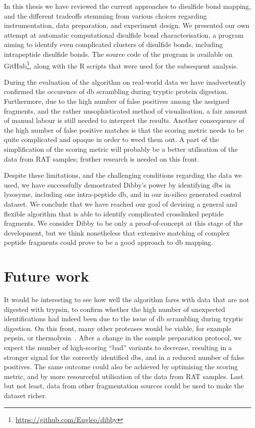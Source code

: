 
In this thesis we have reviewed the current approaches to disulfide bond mapping, and the different tradeoffs stemming from various choices regarding instrumentation, data preparation, and experiment design. We presented our own attempt at automatic computational disulfide bond characterisation, a program aiming to identify even complicated clusters of disulfide bonds, including intrapeptide disulfide bonds. The source code of the program is available on GitHub\footnote{\url{https://github.com/Eugleo/dibby}}, along with the R scripts that were used for the subsequent analysis.

During the evaluation of the algorithm on real-world data we have inadvertently confirmed the occurence of \gls*{db} scrambling during tryptic protein digestion. Furthermore, due to the high number of false positives among the assigned fragments, and the rather unsophisticated method of visualisation, a fair amount of manual labour is still needed to interpret the results. Another consequence of the high number of false positive matches is that the scoring metric needs to be quite complicated and opaque in order to weed them out. A part of the simplification of the scoring metric will probably be a better utilisation of the data from RAT samples; fruther research is needed on this front.

Despite these limitations, and the challenging conditions regarding the data we used, we have successfully demostrated Dibby's power by identifying \glspl*{db} in lysosyme, including one intra-peptide \gls*{db}, and in our in-silico generated control dataset. We conclude that we have reached our goal of devising a general and flexible algorithm that is able to identify complicated crosslinked peptide fragments. We consider Dibby to be only a proof-of-concept at this stage of the development, but we think nonetheless that extensive matching of complex peptide fragments could prove to be a good approach to \gls*{db} mapping.

\section*{Future work}

It would be interesting to see how well the algorithm fares with data that are not digested with trypsin, to confirm whether the high number of unexpected identifications had indeed been due to the issue of \gls*{db} scrambling during tryptic digestion. On this front, many other proteases would be viable, for example pepsin, or thermolysin~\cite{sung2016evaluation}. After a change in the sample preparation protocol, we expect the number of high-scoring ``bad'' variants to decrease, resulting in a stronger signal for the correctly identified \glspl*{db}, and in a reduced number of false positives. The same outcome could also be achieved by optimising the scoring metric, and by more resourceful utilisation of the data from RAT samples. Last but not least, data from other fragmentation sources could be used to make the dataset richer.

